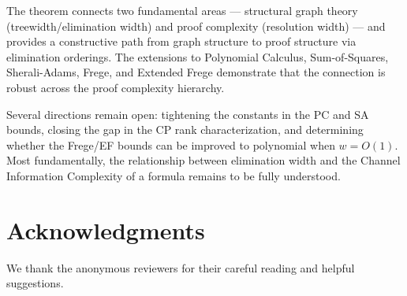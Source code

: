 \documentclass[11pt]{article}
\begin{document}
The theorem connects two fundamental areas --- structural graph theory (treewidth/elimination width) and proof complexity (resolution width) --- and provides a constructive path from graph structure to proof structure via elimination orderings. The extensions to Polynomial Calculus, Sum-of-Squares, Sherali-Adams, Frege, and Extended Frege demonstrate that the connection is robust across the proof complexity hierarchy.

Several directions remain open: tightening the constants in the PC and SA bounds, closing the gap in the CP rank characterization, and determining whether the Frege/EF bounds can be improved to polynomial when $w = O(1)$. Most fundamentally, the relationship between elimination width and the Channel Information Complexity of a formula remains to be fully understood.

\section*{Acknowledgments}

We thank the anonymous reviewers for their careful reading and helpful suggestions.
\end{document}
